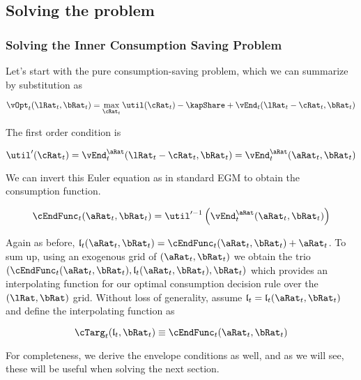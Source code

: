 \documentclass[\econtexRoot/EGMN]{subfiles}
\begin{document}
\subsection{Solving the problem}

\subsubsection{Solving the Inner Consumption Saving Problem}

Let's start with the pure consumption-saving problem, which we can summarize by
substitution as

\begin{equation}
  \vOpt_{t}(\lRat_{t}, \bRat_{t}) = \max_{\cRat_{t}} \util(\cRat_{t}) - \kapShare +
  \vEnd_{t}(\lRat_{t} - \cRat_{t}, \bRat_{t})
\end{equation}

The first order condition is

\begin{equation}
  \util'(\cRat_{t}) = \vEnd_{t}^{\aRat}(\lRat_{t}-\cRat_{t}, \bRat_{t}) =
  \vEnd_{t}^{\aRat}(\aRat_{t}, \bRat_{t})
\end{equation}

We can invert this Euler equation as in standard EGM to obtain the consumption
function.

\begin{equation}
  \cEndFunc_{t}(\aRat_{t}, \bRat_{t}) =
  \util'^{-1}\left(\vEnd_{t}^{\aRat}(\aRat_{t}, \bRat_{t})\right)
\end{equation}

\providecommand{\lEndFunc}{\ensuremath{\mathfrak{l}}}

Again as before, $\lEndFunc_{t}(\aRat_{t}, \bRat_{t}) =
  \cEndFunc_{t}(\aRat_{t}, \bRat_{t}) + \aRat_{t}$. To sum up, using an
exogenous
grid of $(\aRat_{t}, \bRat_{t})$ we obtain the trio $(\cEndFunc_{t}(\aRat_{t},
  \bRat_{t}), \lEndFunc_{t}(\aRat_{t},
  \bRat_{t}), \bRat_{t})$ which
provides an
interpolating function for our optimal consumption decision rule over the
$(\lRat, \bRat)$ grid. Without loss of generality, assume $\lEndFunc_{t} =
  \lEndFunc_{t}(\aRat_{t}, \bRat_{t})$ and define the interpolating
function as

\begin{equation}
  \cTarg_{t}(\lEndFunc_{t}, \bRat_{t}) \equiv \cEndFunc_{t}(\aRat_{t},
  \bRat_{t})
\end{equation}

For completeness, we derive the envelope conditions as well, and as we will
see, these will be useful when solving the next section.
\end{document}
